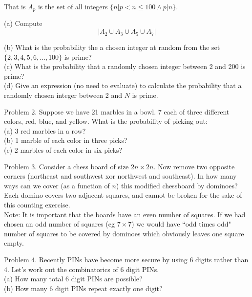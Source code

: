 \documentclass[16 pt]{amsart}
\theoremstyle{definition}
\theoremstyle{remark}
\numberwithin{equation}{subsection}
\begin{document}
That is $A_p$ is the set of all integers $\{n | p<n\le 100 \wedge p|n \}$.

(a) Compute
\[
| A_2 \cup A_3 \cup A_5 \cup A_7 |
\]

(b) What is the probability the a chosen integer at random from the set $\{2,3,4,5,6,\dots,100\}$ is prime?\\

(c) What is the probability that a randomly chosen integer between 2 and 200 is prime?\\

(d) Give an expression (no need to evaluate) to calculate the probability that a randomly chosen integer between 2 and $N$ is prime.

\newpage

Problem 2. Suppose we have 21 marbles in a bowl.  7 each of three different colors, red, blue, and yellow.  What is the probability of picking out:\\

(a) 3 red marbles in a row?\\

(b) 1 marble of each color in three picks?\\

(c) 2 marbles of each color in six picks?

\newpage

Problem 3. Consider a chess board of size $2n\times 2n$.  Now remove two opposite corners (northeast and southwest xor northwest and southeast).  In how many ways can we cover (as a function of $n$) this modified chessboard by dominoes?  Each domino covers two adjacent squares, and cannot be broken for the sake of this counting exercise.\\

Note: It is important that the boards have an even number of squares.  If we had chosen an odd number of squares (eg $7\times 7$) we would have ``odd times odd" number of squares to be covered by dominoes which obviously leaves one square empty.

\newpage

Problem 4. Recently PINs have become more secure by using 6 digits rather than 4.  Let's work out the combinatorics of 6 digit PINs.\\

(a) How many total 6 digit PINs are possible?\\

(b) How many 6 digit PINs repeat exactly one digit?\\
\end{document}
